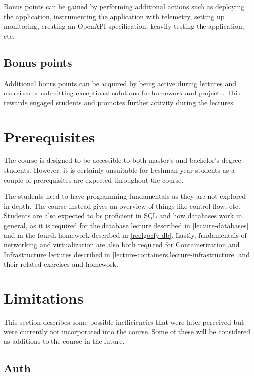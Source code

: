 \documentclass[
  digital,
  color,
  oneside,
  nosansbold,
  nocolorbold,
  nolof,
  nolot,
]{fithesis4}
\begin{document}
\noindent
Bonus points can be gained by performing additional actions such as deploying the application, instrumenting the application with telemetry, setting up monitoring, creating an OpenAPI specification, heavily testing the application, etc.

\subsection{Bonus points}

Additional bonus points can be acquired by being active during lectures and exercises or submitting exceptional solutions for homework and projects. This rewards engaged students and promotes further activity during the lectures.

\section{Prerequisites}

The course is designed to be accessible to both master's and bachelor's degree students. However, it is certainly unsuitable for freshman-year students as a couple of prerequisites are expected throughout the course.

The students need to have programming fundamentals as they are not explored in-depth. The course instead gives an overview of things like control flow, etc. Students are also expected to be proficient in SQL and how databases work in general, as it is required for the database lecture described in \cref{lecture-databases} and in the fourth homework described in \cref{reelgoofy-db}. Lastly, fundamentals of networking and virtualization are also both required for Containerization and Infrastructure lectures described in \cref{lecture-containers,lecture-infrastructure} and their related exercises and homework.

\section{Limitations}\label{design-limitations}

This section describes some possible inefficiencies that were later perceived but were currently not incorporated into the course. Some of these will be considered as additions to the course in the future.

\subsection{Auth}
\end{document}
